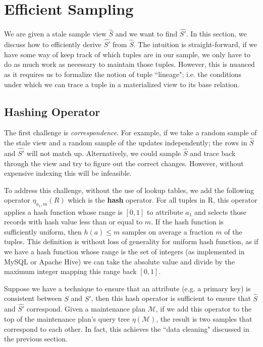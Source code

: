 \section{Efficient Sampling}
We are given a stale sample view $\hat{S}$ and we want to find $\hat{S'}$.
In this section, we discuss how to efficiently derive $\hat{S'}$ from $\hat{S}$.
The intuition is straight-forward, if we have some way of keep track of which tuples are in our sample, we only have to do as much work as necessary to maintain those tuples. 
However, this is nuanced as it requires us to formalize the notion of tuple ``lineage"; i.e. the conditions under which we can trace a tuple in a materialized view to its base relation.

\subsection{Hashing Operator}


The first challenge is \emph{correspondence}.  
For example, if we take a random sample of the stale view and a random sample of the updates  independently; the rows in $\hat{S}$ and $\hat{S'}$ will not match up. 
Alternatively, we could sample $\hat{S}$  and trace back through the view and try to figure out the correct changes.
However, without expensive indexing this will be infeasible.


To address this challenge, without the use of lookup tables, we add the following operator $\eta_{a_1, m}(R)$ which is the \textbf{hash} operator. 
For all tuples in R, this operator applies a hash function whose range is $[0,1]$ to attribute $a_1$ and selects those records with hash value less than or equal to $m$.
If the hash function is sufficiently uniform, then $h(a) \le m$ samples on average a fraction $m$ of the tuples.
This definition is without loss of generality for uniform hash function, as if we have a hash function whose range is the set of integers (as implemented in MySQL or Apache Hive) we can take the absolute value and divide by the maximum integer mapping this range back $[0,1]$. 

Suppose we have a technique to ensure that an attribute (e.g. a primary key) is consistent  between $S$ and $S'$, then this hash operator is sufficient to ensure that $\hat{S}$ and $\hat{S'}$ correspond.
Given a maintenance plan $\mathcal{M}$, if we add this operator to the top of the maintenance plan's query tree $\eta(\mathcal{M})$,
the result is two samples that correspond to each other. 
In fact, this achieves the ``data cleaning" discussed in the previous section.

